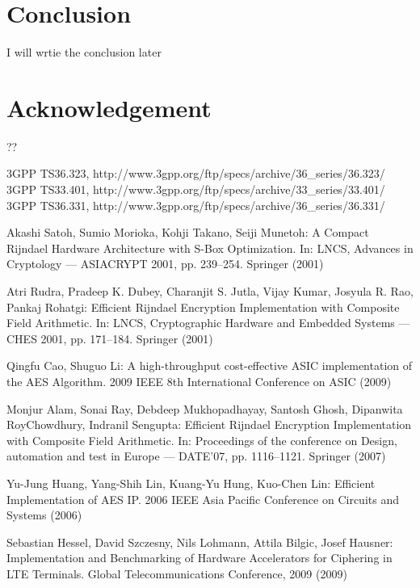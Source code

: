 \documentclass[lnicst,sechang,a4paper]{svmultln}
\begin{document}
\section{Conclusion}
\label{sec:conclusion}
I will wrtie the conclusion later

\section{Acknowledgement}
\label{sec:acknowledgement}
??


\begin{thebibliography}{4}

 3GPP TS36.323, http://www.3gpp.org/ftp/specs/archive/36\_series/36.323/
 3GPP TS33.401, http://www.3gpp.org/ftp/specs/archive/33\_series/33.401/
 3GPP TS36.331, http://www.3gpp.org/ftp/specs/archive/36\_series/36.331/

 Akashi Satoh, Sumio Morioka, Kohji Takano, Seiji Munetoh: A Compact Rijndael Hardware Architecture with S-Box Optimization. In: LNCS, Advances in Cryptology — ASIACRYPT 2001, pp. 239--254. Springer (2001)


 Atri Rudra, Pradeep K. Dubey, Charanjit S. Jutla, Vijay Kumar, Josyula R. Rao, Pankaj Rohatgi: Efficient Rijndael Encryption Implementation with Composite Field Arithmetic. In: LNCS, Cryptographic Hardware and Embedded Systems — CHES 2001, pp. 171--184. Springer (2001)


 Qingfu Cao, Shuguo Li: A high-throughput cost-effective ASIC implementation of the AES Algorithm. 2009 IEEE 8th International Conference on ASIC (2009)


 Monjur Alam, Sonai Ray,	Debdeep Mukhopadhayay, Santosh Ghosh,  Dipanwita RoyChowdhury, Indranil Sengupta: Efficient Rijndael Encryption Implementation with Composite Field Arithmetic. In: Proceedings of the conference on Design, automation and test in Europe
 — DATE'07, pp. 1116--1121. Springer (2007)


 Yu-Jung Huang, Yang-Shih Lin,  Kuang-Yu Hung, Kuo-Chen Lin: Efficient Implementation of AES IP. 2006 IEEE Asia Pacific Conference on Circuits and Systems (2006)

 Sebastian Hessel, David Szczesny, Nils Lohmann, Attila Bilgic, Josef Hausner: Implementation and Benchmarking of Hardware Accelerators for Ciphering in LTE Terminals. Global Telecommunications Conference, 2009 (2009)


\end{thebibliography}
\end{document}
